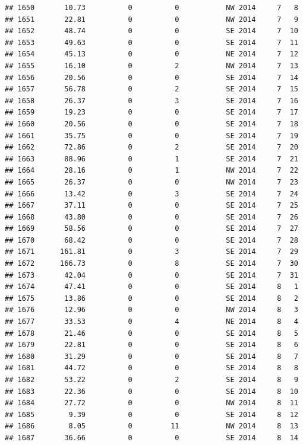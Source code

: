 \documentclass[
]{article}
\begin{document}
\begin{verbatim}
## 1650       10.73          0          0           NW 2014     7   8
## 1651       22.81          0          0           NW 2014     7   9
## 1652       48.74          0          0           SE 2014     7  10
## 1653       49.63          0          0           SE 2014     7  11
## 1654       45.13          0          0           NE 2014     7  12
## 1655       16.10          0          2           NW 2014     7  13
## 1656       20.56          0          0           SE 2014     7  14
## 1657       56.78          0          2           SE 2014     7  15
## 1658       26.37          0          3           SE 2014     7  16
## 1659       19.23          0          0           SE 2014     7  17
## 1660       20.56          0          0           SE 2014     7  18
## 1661       35.75          0          0           SE 2014     7  19
## 1662       72.86          0          2           SE 2014     7  20
## 1663       88.96          0          1           SE 2014     7  21
## 1664       28.16          0          1           NW 2014     7  22
## 1665       26.37          0          0           NW 2014     7  23
## 1666       13.42          0          3           SE 2014     7  24
## 1667       37.11          0          0           SE 2014     7  25
## 1668       43.80          0          0           SE 2014     7  26
## 1669       58.56          0          0           SE 2014     7  27
## 1670       68.42          0          0           SE 2014     7  28
## 1671      161.81          0          3           SE 2014     7  29
## 1672      166.73          0          8           SE 2014     7  30
## 1673       42.04          0          0           SE 2014     7  31
## 1674       47.41          0          0           SE 2014     8   1
## 1675       13.86          0          0           SE 2014     8   2
## 1676       12.96          0          0           NW 2014     8   3
## 1677       33.53          0          4           NE 2014     8   4
## 1678       21.46          0          0           SE 2014     8   5
## 1679       22.81          0          0           SE 2014     8   6
## 1680       31.29          0          0           SE 2014     8   7
## 1681       44.72          0          0           SE 2014     8   8
## 1682       53.22          0          2           SE 2014     8   9
## 1683       22.36          0          0           SE 2014     8  10
## 1684       27.72          0          0           NW 2014     8  11
## 1685        9.39          0          0           SE 2014     8  12
## 1686        8.05          0         11           NW 2014     8  13
## 1687       36.66          0          0           SE 2014     8  14

\end{verbatim}
\end{document}
